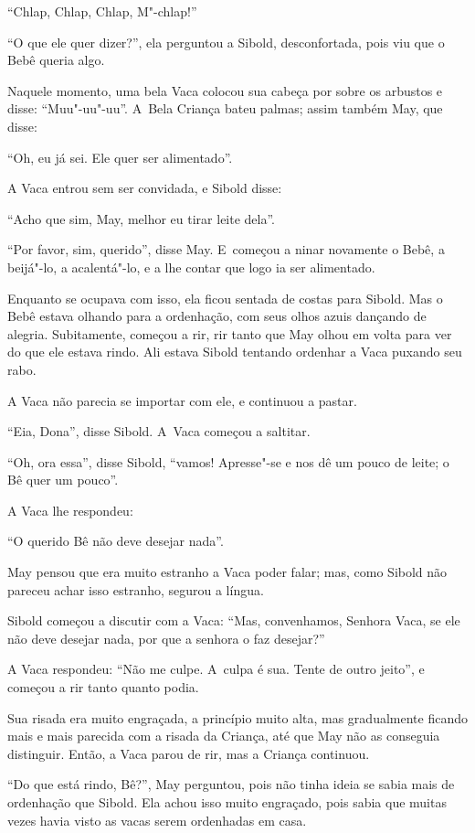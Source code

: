 ``Chlap, Chlap, Chlap, M"-chlap!''

``O que ele quer dizer?'', ela perguntou a Sibold, desconfortada, pois
viu que o Bebê queria algo.

Naquele momento, uma bela Vaca colocou sua cabeça por sobre os arbustos
e disse: ``Muu"-uu"-uu''. A~Bela Criança bateu palmas; assim também May,
que disse:

``Oh, eu já sei. Ele quer ser alimentado''.

A Vaca entrou sem ser convidada, e Sibold disse:

``Acho que sim, May, melhor eu tirar leite dela''.

``Por favor, sim, querido'', disse May. E~começou a ninar novamente o
Bebê, a beijá"-lo, a acalentá"-lo, e a lhe contar que logo ia ser
alimentado.

Enquanto se ocupava com isso, ela ficou sentada de costas para Sibold.
Mas o Bebê estava olhando para a ordenhação, com seus olhos azuis
dançando de alegria. Subitamente, começou a rir, rir tanto que May olhou
em volta para ver do que ele estava rindo. Ali estava Sibold tentando
ordenhar a Vaca puxando seu rabo.

A Vaca não parecia se importar com ele, e continuou a pastar.

``Eia, Dona'', disse Sibold. A~Vaca começou a saltitar.

``Oh, ora essa'', disse Sibold, ``vamos! Apresse"-se e nos dê um pouco de
leite; o Bê quer um pouco''.

A Vaca lhe respondeu:

``O querido Bê não deve desejar nada''.

May pensou que era muito estranho a Vaca poder falar; mas, como Sibold
não pareceu achar isso estranho, segurou a língua.

Sibold começou a discutir com a Vaca: ``Mas, convenhamos, Senhora Vaca,
se ele não deve desejar nada, por que a senhora o faz desejar?''

A Vaca respondeu: ``Não me culpe. A~culpa é sua. Tente de outro jeito'',
e começou a rir tanto quanto podia.

Sua risada era muito engraçada, a princípio muito alta, mas gradualmente
ficando mais e mais parecida com a risada da Criança, até que May não as
conseguia distinguir. Então, a Vaca parou de rir, mas a Criança
continuou.

``Do que está rindo, Bê?'', May perguntou, pois não tinha ideia se sabia
mais de ordenhação que Sibold. Ela achou isso muito engraçado, pois
sabia que muitas vezes havia visto as vacas serem ordenhadas em casa.

